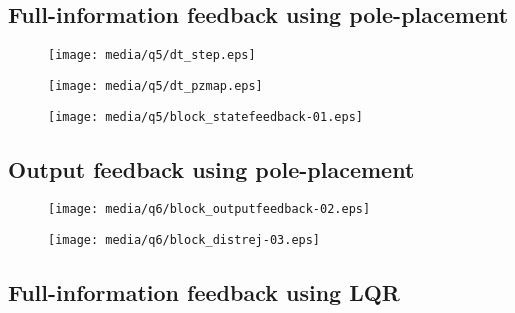 \subsection{Full-information feedback using pole-placement}
\begin{figure}[ht]
    \centering
    \texttt{[image: media/q5/dt\_step.eps]}
    \caption{}
    \label{fig:q5_step}
\end{figure}
\begin{figure}[ht]
    \centering
    \texttt{[image: media/q5/dt\_pzmap.eps]}
    \caption{}
    \label{fig:q5_pzmap}
\end{figure}
\begin{figure}[ht]
    \centering
    \texttt{[image: media/q5/block\_statefeedback-01.eps]}
    \caption{}
    \label{fig:q5_block_statefeedback}
\end{figure}

\subsection{Output feedback using pole-placement}
\begin{figure}[ht]
    \centering
    \texttt{[image: media/q6/block\_outputfeedback-02.eps]}
    \caption{}
    \label{fig:q6_block_servo}
\end{figure}
\begin{figure}[ht]
    \centering
    \texttt{[image: media/q6/block\_distrej-03.eps]}
    \caption{}
    \label{fig:q6_block_distrej}
\end{figure}

\subsection{Full-information feedback using LQR}